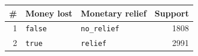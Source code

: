 \begin{tabular}{@{}rllr@{}}
\toprule
\# & Money lost & Monetary relief & Support \\
\midrule
1 & \texttt{false} & \texttt{no\_relief} & 1808 \\
2 & \texttt{true} & \texttt{relief} & 2991 \\
\bottomrule
\end{tabular}
